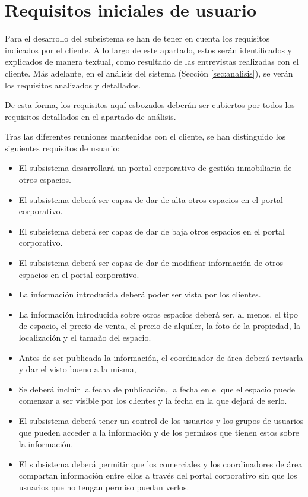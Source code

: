 \section{Requisitos iniciales de usuario}\label{sec:user_req}
\par Para el desarrollo del subsistema se han de tener en cuenta los requisitos indicados por el cliente. A lo largo de este apartado, estos serán identificados y explicados de manera textual, como resultado de las entrevistas realizadas con el cliente. Más adelante, en el análisis del sistema (Sección \ref{sec:analisis}), se verán los requisitos analizados y detallados.

\par De esta forma, los requisitos aquí esbozados deberán ser cubiertos por todos los requisitos detallados en el apartado de análisis.

\par Tras las diferentes reuniones mantenidas con el cliente, se han distinguido los siguientes requisitos de usuario:


\begin{itemize}[-]
    \item El subsistema desarrollará un portal corporativo de gestión inmobiliaria de otros espacios.
    \item El subsistema deberá ser capaz de dar de alta otros espacios en el portal corporativo.
    \item El subsistema deberá ser capaz de dar de baja otros espacios en el portal corporativo.
    \item El subsistema deberá ser capaz de dar de modificar información de otros espacios en el portal corporativo.
    \item La información introducida deberá poder ser vista por los clientes.
    \item La información introducida sobre otros espacios deberá ser, al menos, el tipo de espacio, el precio de venta, el  precio de alquiler, la foto de la propiedad, la localización y el tamaño del espacio.
    \item Antes de ser publicada la información, el coordinador de área deberá revisarla y dar el visto bueno a la misma,
    \item Se deberá incluir la fecha de publicación, la fecha en el que el espacio puede comenzar a ser visible por los clientes y la fecha en la que dejará de serlo.
    \item El subsistema deberá tener un control de los usuarios y los grupos de usuarios que pueden acceder a la información y de los permisos que tienen estos sobre la información.
    \item El subsistema deberá permitir que los comerciales y los coordinadores de área compartan información entre ellos a través del portal corporativo sin que los usuarios que no tengan permiso puedan verlos.
\end{itemize}
